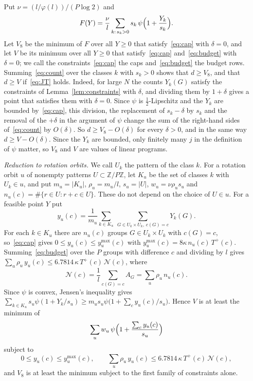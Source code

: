 \documentclass[11pt]{amsart}
\theoremstyle{definition}
\theoremstyle{remark}
\numberwithin{equation}{section}
\newcommand{\Lich}{6.7814}
\begin{document}
Put $\nu=(l/\varphi(l))/(P\log2)$ and
\begin{equation}\label{eq:objective}
F(Y)=\frac\nu l\sum_{k:\,s_k>0}s_k\,\psi\Bigl(1+\frac{Y_k}{s_k}\Bigr).
\end{equation}
Let $V_8$ be the minimum of $F$ over all $Y\ge0$ that satisfy~\eqref{eq:cap} with $\delta=0$, and let $V$ be its minimum over all $Y\ge0$ that satisfy~\eqref{eq:cap} and~\eqref{eq:budget} with $\delta=0$; we call the constraints~\eqref{eq:cap} the caps and~\eqref{eq:budget} the budget rows. Summing~\eqref{eq:count} over the classes $k$ with $s_k>0$ shows that $d\ge V_8$, and that $d\ge V$ if~\eqref{eq:JT} holds. Indeed, for large $N$ the counts $Y_k(G)$ satisfy the constraints of Lemma~\ref{lem:constraints} with $\delta$, and dividing them by $1+\delta$ gives a point that satisfies them with $\delta=0$. Since $\psi$ is $\frac12$-Lipschitz and the $Y_k$ are bounded by~\eqref{eq:cap}, this division, the replacement of $s_k-\delta$ by $s_k$ and the removal of the $+\delta$ in the argument of $\psi$ change the sum of the right-hand sides of~\eqref{eq:count} by $O(\delta)$. So $d\ge V_8-O(\delta)$ for every $\delta>0$, and in the same way $d\ge V-O(\delta)$. Since the $Y_k$ are bounded, only finitely many $j$ in the definition of $\psi$ matter, so $V_8$ and $V$ are values of linear programs.

\emph{Reduction to rotation orbits.} We call $U_k$ the pattern of the class $k$. For a rotation orbit $u$ of nonempty patterns $U\subset\mathbb Z/P\mathbb Z$, let $K_u$ be the set of classes $k$ with $U_k\in u$, and put $m_u=|K_u|$, $\rho_u=m_u/l$, $s_u=|U|$, $w_u=\nu \rho_us_u$ and $n_u(c)=\#\{r\in U:r+c\in U\}$. These do not depend on the choice of $U\in u$. For a feasible point $Y$ put
\[
y_u(c)=\frac1{m_u}\sum_{k\in K_u}\ \sum_{G\in U_k\times U_k,\ c(G)=c}Y_k(G).
\]
For each $k\in K_u$ there are $n_u(c)$ groups $G\in U_k\times U_k$ with $c(G)=c$, so~\eqref{eq:cap} gives $0\le y_u(c)\le y_u^{\max}(c)$ with $y_u^{\max}(c)=8\kappa\,n_u(c)\,T^+(c)$. Summing~\eqref{eq:budget} over the $P$ groups with difference $c$ and dividing by $l$ gives $\sum_u\rho_u\,y_u(c)\le\Lich\,\kappa\,T^+(c)\,\mathcal N(c)$, where
\[
\mathcal N(c)=\frac1l\sum_{c(G)=c}A_G=\sum_u\rho_u\,n_u(c).
\]
Since $\psi$ is convex, Jensen's inequality gives $\sum_{k\in K_u}s_u\psi(1+Y_k/s_u)\ge m_us_u\psi\bigl(1+\sum_cy_u(c)/s_u\bigr)$. Hence $V$ is at least the minimum of
\[
\sum_uw_u\,\psi\Bigl(1+\frac{\sum_cy_u(c)}{s_u}\Bigr)
\]
subject to
\[
0\le y_u(c)\le y_u^{\max}(c),\qquad\sum_u\rho_u\,y_u(c)\le\Lich\,\kappa\,T^+(c)\,\mathcal N(c),
\]
and $V_8$ is at least the minimum subject to the first family of constraints alone.
\end{document}
